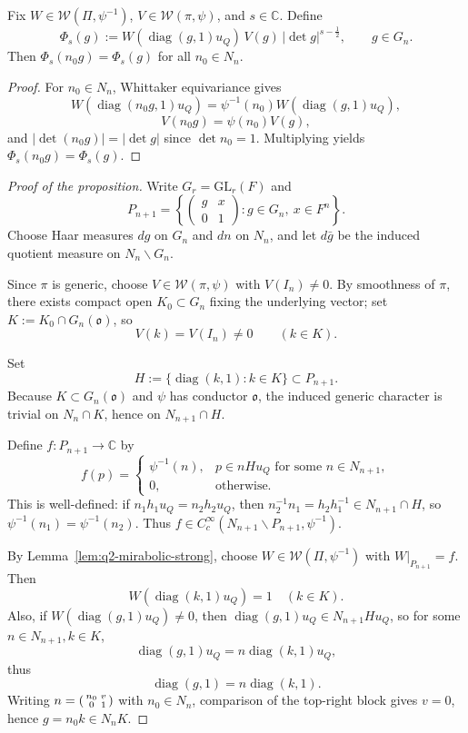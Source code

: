 \begin{lemma}\label{lem:q2-quotient-welldefined}
Fix $W\in\mathcal W(\Pi,\psi^{-1})$, $V\in\mathcal W(\pi,\psi)$, and $s\in\mathbb C$. Define
\[
\Phi_s(g):=W(\operatorname{diag}(g,1)u_Q)\,V(g)\,|\det g|^{s-\frac12},\qquad g\in G_n.
\]
Then $\Phi_s(n_0g)=\Phi_s(g)$ for all $n_0\in N_n$.
\end{lemma}

\begin{proof}
For $n_0\in N_n$, Whittaker equivariance gives
\[
W(\operatorname{diag}(n_0g,1)u_Q)=\psi^{-1}(n_0)W(\operatorname{diag}(g,1)u_Q),
\]
\[
V(n_0g)=\psi(n_0)V(g),
\]
and $|\det(n_0g)|=|\det g|$ since $\det n_0=1$. Multiplying yields $\Phi_s(n_0g)=\Phi_s(g)$.
\end{proof}

\begin{proof}[Proof of the proposition]
Write $G_r=\mathrm{GL}_r(F)$ and
\[
P_{n+1}=\left\{\begin{pmatrix} g & x\\ 0 & 1\end{pmatrix}:g\in G_n,\ x\in F^n\right\}.
\]
Choose Haar measures $dg$ on $G_n$ and $dn$ on $N_n$, and let $d\bar g$ be the induced quotient measure on $N_n\backslash G_n$.

Since $\pi$ is generic, choose $V\in\mathcal W(\pi,\psi)$ with $V(I_n)\neq 0$. By smoothness of $\pi$, there exists compact open $K_0\subset G_n$ fixing the underlying vector; set $K:=K_0\cap G_n(\mathfrak o)$, so
\[
V(k)=V(I_n)\neq 0\qquad (k\in K).
\]

Set
\[
H:=\{\operatorname{diag}(k,1):k\in K\}\subset P_{n+1}.
\]
Because $K\subset G_n(\mathfrak o)$ and $\psi$ has conductor $\mathfrak o$, the induced generic character is trivial on $N_n\cap K$, hence on $N_{n+1}\cap H$.

Define $f:P_{n+1}\to\mathbb C$ by
\[
f(p)=\begin{cases}
\psi^{-1}(n),&p\in nHu_Q\text{ for some }n\in N_{n+1},\\
0,&\text{otherwise.}
\end{cases}
\]
This is well-defined: if $n_1h_1u_Q=n_2h_2u_Q$, then $n_2^{-1}n_1=h_2h_1^{-1}\in N_{n+1}\cap H$, so $\psi^{-1}(n_1)=\psi^{-1}(n_2)$. Thus $f\in C_c^\infty(N_{n+1}\backslash P_{n+1},\psi^{-1})$.

By Lemma~\ref{lem:q2-mirabolic-strong}, choose $W\in\mathcal W(\Pi,\psi^{-1})$ with $W|_{P_{n+1}}=f$.
Then
\[
W(\operatorname{diag}(k,1)u_Q)=1\quad (k\in K).
\]
Also, if $W(\operatorname{diag}(g,1)u_Q)\neq 0$, then $\operatorname{diag}(g,1)u_Q\in N_{n+1}Hu_Q$, so for some $n\in N_{n+1},k\in K$,
\[
\operatorname{diag}(g,1)u_Q=n\operatorname{diag}(k,1)u_Q,
\]
thus
\[
\operatorname{diag}(g,1)=n\operatorname{diag}(k,1).
\]
Writing $n=\begin{psmallmatrix} n_0 & v\\ 0 & 1\end{psmallmatrix}$ with $n_0\in N_n$, comparison of the top-right block gives $v=0$, hence $g=n_0k\in N_nK$.


\end{proof}
